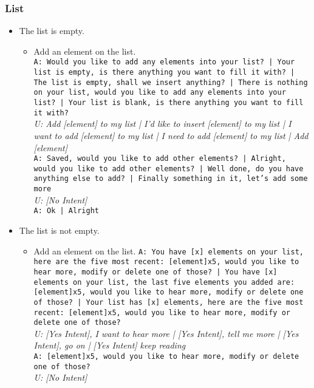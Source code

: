 \subsubsection{List}
\begin{itemize}
		\item The list is empty.\\
		\begin{itemize}
			\item Add an element on the list.\\
			\texttt{A: Would you like to add any elements into your list? | Your list is empty, is there anything you want to fill it with? | The list is empty, shall we insert anything? | There is nothing on your list, would you like to add any elements into your list? | Your list is blank, is there anything you want to fill it with?}\\
			\textit{U: Add [element] to my list | I'd like to insert [element] to my list | I want to add [element] to my list | I need to add [element] to my list | Add [element] }\\
			\texttt{A: Saved, would you like to add other elements? | Alright, would you like to add other elements? | Well done, do you have anything else to add? | Finally something in it, let's add some more}\\
			\textit{U: [No Intent]}\\
			\texttt{A: Ok | Alright}
		\end{itemize}	
		\item The list is not empty.\\
		\begin{itemize}
			\item Add an element on the list.
		\texttt{A: You have [x] elements on your list, here are the five most recent: [element]x5, would you like to hear more, modify or delete one of those? | You have [x] elements on your list, the last five elements you added are: [element]x5, would you like to hear more, modify or delete one of those? | Your list has [x] elements, here are the five most recent: [element]x5, would you like to hear more, modify or delete one of those?}\\
		\textit{U: [Yes Intent], I want to hear more | [Yes Intent], tell me more | [Yes Intent], go on | [Yes Intent] keep reading }\\
		\texttt{A: [element]x5, would you like to hear more, modify or delete one of those?}\\
		\textit{U: [No Intent]}\\

\end{itemize}
\end{itemize}
